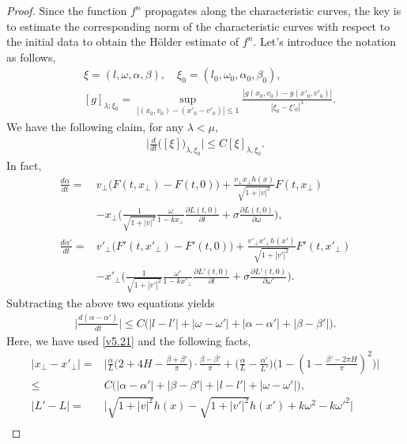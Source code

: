 \documentclass[11pt,reqno]{amsart}%
\theoremstyle{definition}
\theoremstyle{remark}
\begin{document}
\begin{proof}
Since the function $f^{n}$  propagates along the  characteristic curves,
the key is to estimate the corresponding norm of the characteristic curves with respect to the initial data to obtain the    H\"older estimate of $ f^{n}$.
Let's introduce the notation as follows,
\begin{align}
&\xi=(l,\omega,\alpha,\beta),\quad \xi_{0}=(l_{0},\omega_{0},\alpha_{0},\beta_{0}),\nonumber\\
&[g]_{\lambda;\xi_{0}}=\sup_{|(x_{0},v_{0})-(x'_{0}-v'_{0})|\leq 1}\frac{|g(x_{0},v_{0})-g(x'_{0},v'_{0})|}{|\xi_{0}-\xi'_{0}|^{\lambda}}.\nonumber
\end{align}
We have the following claim, for any $\lambda< \mu$,
\begin{align}\label{claimxi}
\Big|\frac{d}{d t}\big([\xi]\big)_{\lambda,\xi_{0}}\Big|\leq C[\xi]_{\lambda,\xi_{0}}. %
\end{align}
In fact,
\begin{align}
\frac{d \alpha}{d t}=&v_{\bot}\Big(F(t,x_{\bot})-F(t,0)\Big)
  +\frac{v_{\bot}x_{\bot}h(x)}{\sqrt{1+|v|^{2}}}F(t,x_{\bot})\nonumber\\
  &-x_{\bot}\big(\frac{1}{\sqrt{1+|v|^{2}}}\frac{\omega}{1-kx_{\bot}}\frac{\partial L(t,0)}{\partial l}+\sigma \frac{\partial L(t,0)}{\partial \omega}\big),\nonumber\\
\frac{d \alpha'}{d t}=&v'_{\bot}\Big(F'(t,x'_{\bot})-F'(t,0)\Big)
  +\frac{v'_{\bot}x'_{\bot}h(x')}{\sqrt{1+|v'|^{2}}}F'(t,x'_{\bot})\nonumber\\
  &-x'_{\bot}\Big(\frac{1}{\sqrt{1+|v'|^{2}}}\frac{\omega'}{1-kx'_{\bot}}\frac{\partial L'(t,0)}{\partial l}+\sigma \frac{\partial L'(t,0)}{\partial \omega'}\Big).\nonumber
\end{align}
Subtracting the above two equations yields
\begin{align}
\Big|\frac{d (\alpha-\alpha')}{d t}\Big|\leq C\Big(|l-l'|+|\omega-\omega'|+|\alpha-\alpha'|+|\beta-\beta'|\Big).\label{v5.22}
\end{align}
Here, we have used \eqref{v5.21} and the following facts,
\begin{align}
|x_{\bot}-x'_{\bot}|=&\Big|\frac{\alpha}{L}\big(2+4H-\frac{\beta+\beta'}{\pi}\big)\cdot \frac{\beta-\beta'}{\pi}+\big(\frac{\alpha}{L}-\frac{\alpha'}{L'}\big)
\big(1-(1-\frac{\beta'-2\pi H}{\pi})^{2}\big)\Big|\nonumber\\
\leq &C\Big(|\alpha-\alpha'|+|\beta-\beta'|+|l-l'|+|\omega-\omega'|\Big),\nonumber\\
|L'-L|=&\Big|\sqrt{1+|v|^{2}}h(x)-\sqrt{1+|v'|^{2}}h(x')+k\omega^{2}-k\omega'^{2}\Big|\nonumber\\

\end{align}
\end{proof}
\end{document}
